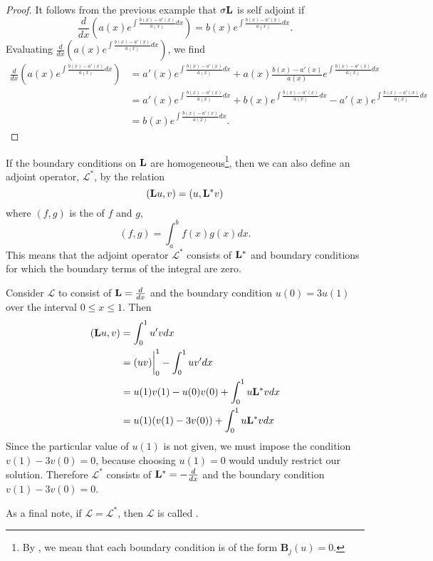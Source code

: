 \begin{proof}
	It follows from the previous example that \(\sigma\mathrm{\bf{L}}\) is self adjoint if
	\begin{equation*}
		\frac{d}{dx}\left(a(x)e^{\int \frac{b(x)-a'(x)}{a(x)}dx}\right) = b(x)e^{\int \frac{b(x)-a'(x)}{a(x)}dx}.
	\end{equation*}
	Evaluating \(\frac{d}{dx}\left(a(x)e^{\int \frac{b(x)-a'(x)}{a(x)}dx}\right)\), we find
	\begin{equation*}
		\begin{split}
			\frac{d}{dx}\left(a(x)e^{\int \frac{b(x)-a'(x)}{a(x)}dx}\right) &= a'(x)e^{\int \frac{b(x)-a'(x)}{a(x)}dx} + a(x)\frac{b(x)-a'(x)}{a(x)}e^{\int \frac{b(x)-a'(x)}{a(x)}dx}\\
			&=a'(x)e^{\int \frac{b(x)-a'(x)}{a(x)}dx} + b(x)e^{\int \frac{b(x)-a'(x)}{a(x)}dx} - a'(x)e^{\int \frac{b(x)-a'(x)}{a(x)}dx}\\
			&=b(x)e^{\int \frac{b(x)-a'(x)}{a(x)}dx}.
		\end{split}
	\end{equation*}
\end{proof}

\begin{definition}
	If the boundary conditions on \(\mathrm{\bf{L}}\) are homogeneous\footnote{By , we mean that each boundary condition is of the form \(\mathbf{B}_j (u)=0\).}, then we can also define an adjoint operator, \(\mathcal{L}^*\), by the relation
	\begin{equation}
		(\mathrm{\bf{L}} u,v) = (u,\mathrm{\bf{L^*}} v)
	\end{equation}
	where \((f,g)\) is the  of \(f\) and \(g\),
	\begin{equation}
		(f,g) = \int_a^bf(x)g(x)dx.
	\end{equation}
	This means that the adjoint operator \(\mathcal{L}^*\) consists of \(\mathrm{\bf{L^*}} \) and boundary conditions for which the boundary terms of the integral are zero. 
\end{definition}

\begin{example}
	Consider \(\mathcal{L}\) to consist of \(\mathrm{\bf{L}}=\frac{d}{dx}\) and the boundary condition \(u(0)=3u(1)\) over the interval \(0\leq x \leq 1\). Then
	\begin{equation}
		\begin{split}
			(\mathrm{\bf{L}} u,v) &= \int_0^1u'vdx\\
			       &= (uv)\biggr\rvert_0^1 - \int_0^1 uv'dx\\
			       &= u(1)v(1)-u(0)v(0)+\int_0^1u\mathrm{\bf{L^*}} vdx\\
			       &= u(1)(v(1)-3v(0)) + \int_0^1u\mathrm{\bf{L^*}} vdx
		\end{split}
	\end{equation}
	Since the particular value of \(u(1)\) is not given, we must impose the condition \(v(1)-3v(0)=0\), because choosing \(u(1)=0\) would unduly restrict our solution. Therefore \(\mathcal{L^*}\) consists of \(\mathrm{\bf{L^*}} = -\frac{d}{dx}\) and the boundary condition \(v(1) - 3v(0)=0\). 
\end{example}As a final note, if \(\mathcal{L}=\mathcal{L}^*\), then \(\mathcal{L}\) is called .
